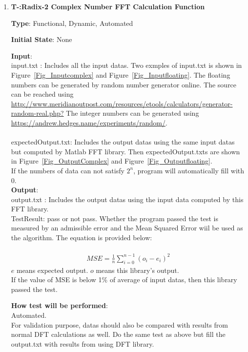 \documentclass[12pt, titlepage]{article}
\newcounter{tnum}
\begin{document}
\begin{enumerate}

\item{\textbf{T-\thetnum \label{R2CFFT}:Radix-2 Complex Number FFT Calculation Function}}

\textbf {Type}: Functional, Dynamic, Automated
					
\textbf {Initial State}: None
					
\textbf {Input}:\\{\large input.txt} :  Includes all the input datas. Two exmples of input.txt is shown in Figure~\ref{Fig_Inputcomplex} and Figure~\ref{Fig_Inputfloating}. The floating numbers can be generated by random number generator online. The source can be reached using    \url  {http://www.meridianoutpost.com/resources/etools/calculators/generator-random-real.php?} The integer numbers can be generated using \url {https://andrew.hedges.name/experiments/random/}.\\\\ 
{\large expectedOutput.txt}:  Includes the output datas using the same input datas but computed by Matlab FFT library. Then expectedOutput.txts  are shown in Figure~\ref{Fig_OutputComplex} and Figure~\ref{Fig_Outputfloating}. \\ 
If the numbers of data can not satisfy $2^n$, program will automatically fill with 0.\\
					
\textbf {Output}: \\{\large output.txt} : Includes the output datas using the input data computed by this FFT library.\\
{\large TestResult}: pass or not pass. Whether the program passed the test is measured by an admissible error and the Mean Squared Error wiil be used as the algorithm. The equation is provided below:\\\\
\begin{gather}
MSE = \frac{1}{n}\sum_{i=0}^{n-1} (o_i - e_i)^2
\end{gather}
$e$ means expected output. $o$ means this library's output.\\
If the value of MSE is below 1\% of average of input datas, then this library passed the test.


			
\textbf {How test will be performed}: \\
Automated.\\
For validation purpose, datas should also be compared with results from normal DFT calculations as well. Do the same test as above but fill the output.txt with results from using DFT library.


\end{enumerate}
\end{document}
